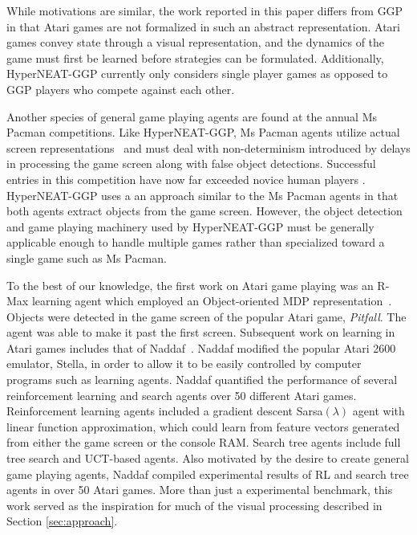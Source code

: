 \documentclass{acm_proc_article-sp}
\begin{document}
While motivations are similar, the work reported in this paper differs from GGP in that Atari games are not formalized in such an abstract representation. Atari games convey state through a visual representation, and the dynamics of the game must first be learned before strategies can be formulated. Additionally, HyperNEAT-GGP currently only considers single player games as opposed to GGP players who compete against each other.

Another species of general game playing agents are found at the annual Ms Pacman competitions. Like HyperNEAT-GGP, Ms Pacman agents utilize actual screen representations~\cite{pacmancompetition} and must deal with non-determinism introduced by delays in processing the game screen along with false object detections. Successful entries in this competition have now far exceeded novice human players \cite{sigevolution2007}. HyperNEAT-GGP uses a an approach similar to the Ms Pacman agents in that both agents extract objects from the game screen. However, the object detection and game playing machinery used by HyperNEAT-GGP must be generally applicable enough to handle multiple games rather than specialized toward a single game such as Ms Pacman.

To the best of our knowledge, the first work on Atari game playing was an R-Max learning agent which employed an Object-oriented MDP representation~\cite{duik08}. Objects were detected in the game screen of the popular Atari game, \emph{Pitfall}. The agent was able to make it past the first screen. Subsequent work on learning in Atari games includes that of Naddaf~\cite{naddaf10}. Naddaf modified the popular Atari 2600 emulator, Stella, in order to allow it to be easily controlled by computer programs such as learning agents. Naddaf quantified the performance of several reinforcement learning and search agents over 50 different Atari games. Reinforcement learning agents included a gradient descent Sarsa$(\lambda)$ agent with linear function approximation, which could learn from feature vectors generated from either the game screen or the console RAM. Search tree agents include full tree search and UCT-based agents. Also motivated by the desire to create general game playing agents, Naddaf compiled experimental results of RL and search tree agents in over 50 Atari games. More than just a experimental benchmark, this work served as the inspiration for much of the visual processing described in Section \ref{sec:approach}.
\end{document}
